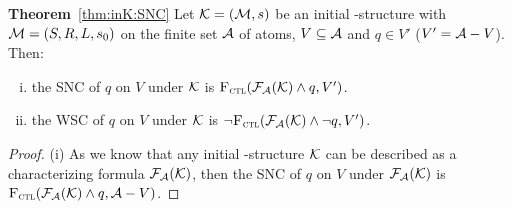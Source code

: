 \documentclass{article}
\begin{document}
\textbf{Theorem}~\ref{thm:inK:SNC} Let ${\cal K}= ({\cal M}, s)$ be an initial \MPK-structure with ${\cal M}=(S,R,L,s_0)$ on the finite set ${\cal A}$ of atoms, $V \subseteq {\cal A}$ and $q\in V'$ ($V' = {\cal A} - V$). Then:
 \begin{enumerate}[(i)]
   \item the SNC of $q$ on $V$ under ${\cal K}$ is ${\textsc{F}_{\textsc{ctl}}}({\cal F}_{{\cal A}}({\cal K}) \wedge q, V')$.
   \item the WSC of $q$ on $V$ under ${\cal K}$ is $\neg {\textsc{F}_{\textsc{ctl}}}({\cal F}_{{\cal A}}({\cal K}) \wedge \neg q, V')$.
 \end{enumerate}
\begin{proof}
(i)
As we know that any initial \MPK-structure ${\cal K}$ can be described as a characterizing formula ${\cal F}_{{\cal A}}({\cal K})$, then the SNC of $q$ on $V$ under ${\cal F}_{{\cal A}}({\cal K})$ is ${\textsc{F}_{\textsc{ctl}}}({\cal F}_{{\cal A}}({\cal K}) \wedge q, {\cal A} - V)$.

%


\end{proof}
\end{document}
